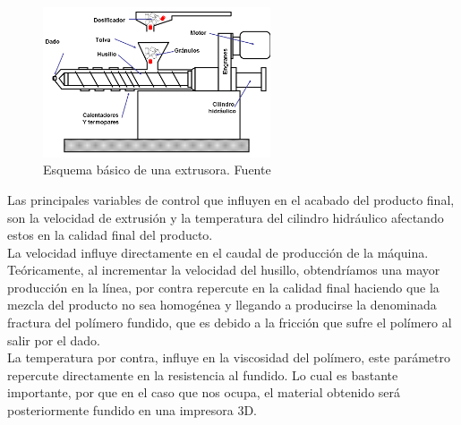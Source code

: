 \begin{figure}[H]
        \centering
        \includegraphics[width=0.6\textwidth]{images/extrusor.png}
        \caption{Esquema básico de una extrusora. Fuente \cite{disenoextrusor}}
        \label{fig:estado_extrusora}
\end{figure}

Las principales variables de control que influyen en el acabado del producto final, son la velocidad de extrusión y la temperatura del cilindro hidráulico afectando estos en la calidad final del producto.\\

La velocidad influye directamente en el caudal de producción de la máquina. Teóricamente, al incrementar la velocidad del husillo, obtendríamos una mayor producción en la línea, por contra repercute en la calidad final haciendo que la mezcla del producto no sea homogénea y llegando a producirse la denominada fractura del polímero fundido, que es debido a la fricción que sufre el polímero al salir por el dado.\\

La temperatura por contra, influye en la viscosidad del polímero, este parámetro repercute directamente en la resistencia al fundido. Lo cual es bastante importante, por que en el caso que nos ocupa, el  material obtenido será posteriormente fundido en una impresora 3D.\\

